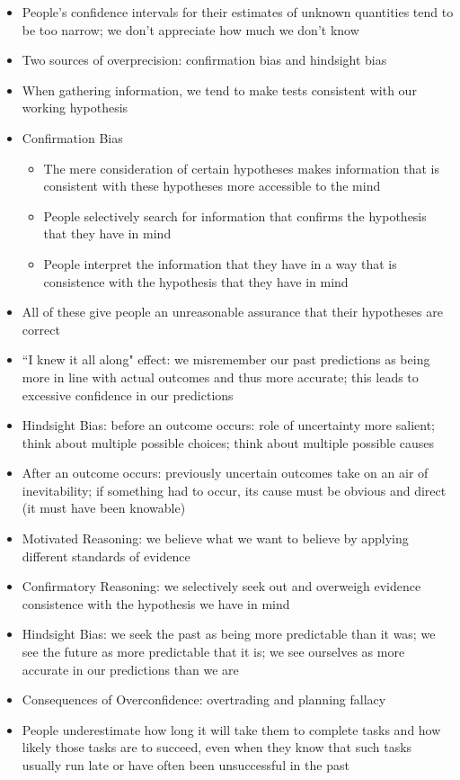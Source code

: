 \documentclass[12pt]{article}
\begin{document}
\begin{itemize}
\item People's confidence intervals for their estimates of unknown quantities tend to be too narrow; we don't appreciate how much we don't know 
\item Two sources of overprecision: confirmation bias and hindsight bias
\item When gathering information, we tend to make tests consistent with our working hypothesis
\item Confirmation Bias \begin{itemize} 
\item The mere consideration of certain hypotheses makes information that is consistent with these hypotheses more accessible to the mind 
\item People selectively search for information that confirms the hypothesis that they have in mind 
\item People interpret the information that they have in a way that is consistence with the hypothesis that they have in mind \end{itemize} 
\item All of these give people an unreasonable assurance that their hypotheses are correct 
\item ``I knew it all along" effect: we misremember our past predictions as being more in line with actual outcomes and thus more accurate; this leads to excessive confidence in our predictions 
\item Hindsight Bias: before an outcome occurs: role of uncertainty more salient; think about multiple possible choices; think about multiple possible causes 
\item After an outcome occurs: previously uncertain outcomes take on an air of inevitability; if something had to occur, its cause must be obvious and direct (it must have been knowable) 
\item Motivated Reasoning: we believe what we want to believe by applying different standards of evidence 
\item Confirmatory Reasoning: we selectively seek out and overweigh evidence consistence with the hypothesis we have in mind 
\item Hindsight Bias: we seek the past as being more predictable than it was; we see the future as more predictable that it is; we see ourselves as more accurate in our predictions than we are 
\item Consequences of Overconfidence: overtrading and planning fallacy 
\item People underestimate how long it will take them to complete tasks and how likely those tasks are to succeed, even when they know that such tasks usually run late or have often been unsuccessful in the past 

\end{itemize}
\end{document}
